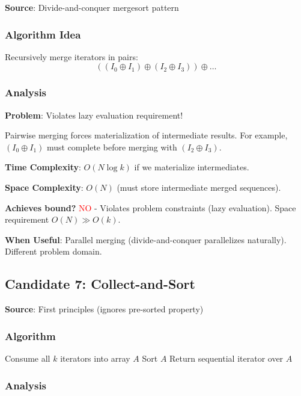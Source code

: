 \documentclass[11pt]{article}
\begin{document}
\textbf{Source}: Divide-and-conquer mergesort pattern

\subsubsection{Algorithm Idea}

Recursively merge iterators in pairs:
\[
((I_0 \oplus I_1) \oplus (I_2 \oplus I_3)) \oplus \ldots
\]

\subsubsection{Analysis}

\textbf{Problem}: Violates lazy evaluation requirement!

Pairwise merging forces materialization of intermediate results. For example, $(I_0 \oplus I_1)$ must complete before merging with $(I_2 \oplus I_3)$.

\textbf{Time Complexity}: $O(N \log k)$ if we materialize intermediates.

\textbf{Space Complexity}: $O(N)$ (must store intermediate merged sequences).

\textbf{Achieves bound?} \textcolor{red}{NO} - Violates problem constraints (lazy evaluation). Space requirement $O(N) \gg O(k)$.

\textbf{When Useful}: Parallel merging (divide-and-conquer parallelizes naturally). Different problem domain.

\subsection{Candidate 7: Collect-and-Sort}

\textbf{Source}: First principles (ignores pre-sorted property)

\subsubsection{Algorithm}

\begin{algorithmic}
\State Consume all $k$ iterators into array $A$
\State Sort $A$
\State Return sequential iterator over $A$
\end{algorithmic}

\subsubsection{Analysis}
\end{document}
